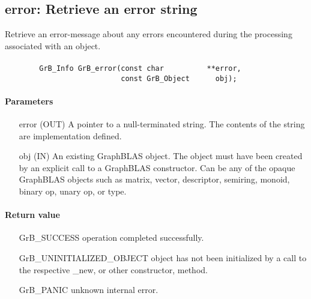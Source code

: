 \subsection{{\sf error}: Retrieve an error string}
\label{Sec:GrB_error}

Retrieve an error-message about any errors encountered during the processing associated with an object.

\paragraph{\syntax}

\begin{verbatim}
        GrB_Info GrB_error(const char          **error,
                           const GrB_Object      obj);
\end{verbatim}

\paragraph{Parameters}

\begin{itemize}[leftmargin=1.1in]
	\item[{\sf error}] ({\sf OUT}) A pointer to a null-terminated
		string. The contents of the string are implementation
		defined.

        \item[{\sf obj}] ({\sf IN}) An existing GraphBLAS object.
        The object must have been created by an explicit call to a
        GraphBLAS constructor.  Can be any of the opaque GraphBLAS
        objects such as matrix, vector, descriptor, semiring, monoid,
        binary op, unary op, or type.
\end{itemize}


\paragraph{Return value}
\begin{itemize}[leftmargin=2.3in]
	\item[{\sf GrB\_SUCCESS}]                operation completed successfully.
	\item[{\sf GrB\_UNINITIALIZED\_OBJECT}]  object has not been initialized by a call to the respective {\sf *\_new}, or other constructor, method.
	\item[{\sf GrB\_PANIC}]                  unknown internal error.
\end{itemize}

